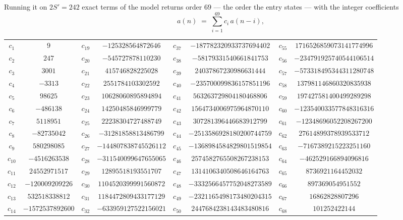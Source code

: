 \documentclass[11pt,a4paper]{article}
\theoremstyle{plain}
\theoremstyle{definition}
\begin{document}
Running it on $2S'=242$ exact terms of the model returns order $69$ --- the order the
entry states --- with the integer coefficients
\[
a(n)\;=\;\sum_{i=1}^{69}c_i\,a(n-i),
\]
\begin{center}\small
\begin{tabular}{cccccccc}
$c_{1}$ & $9$ & $c_{19}$ & $-125328564872646$ & $c_{37}$ & $-187782320933737694402$ & $c_{55}$ & $1716526859073141774996$ \\
$c_{2}$ & $247$ & $c_{20}$ & $-545727878110230$ & $c_{38}$ & $-58179331540661841753$ & $c_{56}$ & $-234791925740544106514$ \\
$c_{3}$ & $3001$ & $c_{21}$ & $415746828225028$ & $c_{39}$ & $24037867230986631444$ & $c_{57}$ & $-573318495344311280748$ \\
$c_{4}$ & $-3313$ & $c_{22}$ & $2551784103302592$ & $c_{40}$ & $-235700099836157851196$ & $c_{58}$ & $137981146860320835938$ \\
$c_{5}$ & $98625$ & $c_{23}$ & $10628060895894894$ & $c_{41}$ & $563263729804180468806$ & $c_{59}$ & $197427581400499289298$ \\
$c_{6}$ & $-486138$ & $c_{24}$ & $14250485846999779$ & $c_{42}$ & $1564734006975964870110$ & $c_{60}$ & $-123540033577848316316$ \\
$c_{7}$ & $5118951$ & $c_{25}$ & $22238304727488749$ & $c_{43}$ & $307281396446683912799$ & $c_{61}$ & $-12348696052208267200$ \\
$c_{8}$ & $-82735042$ & $c_{26}$ & $-31281858813486799$ & $c_{44}$ & $-2513586928180200744759$ & $c_{62}$ & $27614899378939533712$ \\
$c_{9}$ & $580298085$ & $c_{27}$ & $-144807838745526112$ & $c_{45}$ & $-1368984584829801519854$ & $c_{63}$ & $-7167389215223251160$ \\
$c_{10}$ & $-4516263538$ & $c_{28}$ & $-311540099647655065$ & $c_{46}$ & $2574582765508267238153$ & $c_{64}$ & $-462529166894096816$ \\
$c_{11}$ & $24552971517$ & $c_{29}$ & $12895518193551707$ & $c_{47}$ & $1314106340508646164763$ & $c_{65}$ & $8736921164452032$ \\
$c_{12}$ & $-120009209226$ & $c_{30}$ & $1104520399991560872$ & $c_{48}$ & $-3332566457752048273589$ & $c_{66}$ & $897369054951552$ \\
$c_{13}$ & $532518338812$ & $c_{31}$ & $1184472809433177129$ & $c_{49}$ & $-2321165498173480204315$ & $c_{67}$ & $16862828807296$ \\
$c_{14}$ & $-1572537892600$ & $c_{32}$ & $-633959127522156021$ & $c_{50}$ & $2447684238143483480816$ & $c_{68}$ & $101252422144$ \\

\end{tabular}
\end{center}
\end{document}
